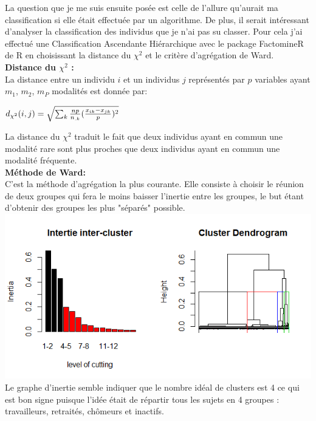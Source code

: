 \documentclass{book}
\begin{document}
\noindent
La question que je me suis ensuite posée est celle de l'allure qu'aurait ma classification si elle était effectuée par un algorithme. De plus, il serait intéressant d'analyser la classification des individus que je n'ai pas su classer.
Pour cela j'ai effectué une Classification Ascendante Hiérarchique avec le package FactomineR de R en choisissant la distance du $\chi^2$ et le critère d'agrégation de Ward.\\

\noindent
\textbf{Distance du $\chi^2$ :}\\
\noindent
La distance entre un individu $i$ et un individus $j$ représentés par $p$ variables ayant $m_1$, $m_2$, $m_P$ modalités est donnée par:
\begin{center}
$d_{\chi^2}(i,j) = \sqrt{\sum_k{{np \over n_{.k}} {( {x_{ik}-x_{jk}\over p})^2}}}$
\end{center}
La distance du $\chi^2$ traduit le fait que deux individus ayant en commun une modalité rare sont plus proches que deux individus ayant en commun une modalité fréquente.\\

\noindent
\textbf{Méthode de Ward:}\\
C'est la méthode d'agrégation la plus courante. Elle consiste à choisir le réunion de deux groupes qui fera le moins baisser l'inertie entre les groupes, le but étant d'obtenir des groupes les plus "séparés" possible.\\


\includegraphics[scale = 1]{dendro_inertie_cah.png}
\noindent
Le graphe d'inertie semble indiquer que le nombre idéal de clusters est 4 ce qui est bon signe puisque l'idée était de répartir tous les sujets en 4 groupes : travailleurs, retraités, chômeurs et inactifs.\\
\end{document}
